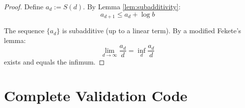 \documentclass[11pt,a4paper]{article}
\theoremstyle{definition}
\theoremstyle{remark}
\begin{document}
\begin{proof}
Define $a_d := S(d)$. By Lemma \ref{lem:subadditivity}:
\begin{equation}
    a_{d+1} \leq a_d + \log b
\end{equation}

The sequence $\{a_d\}$ is subadditive (up to a linear term). By a modified Fekete's lemma:
\begin{equation}
    \lim_{d \to \infty} \frac{a_d}{d} = \inf_d \frac{a_d}{d}
\end{equation}
exists and equals the infimum.
\end{proof}

\section{Complete Validation Code}
\label{app:code}
\end{document}
